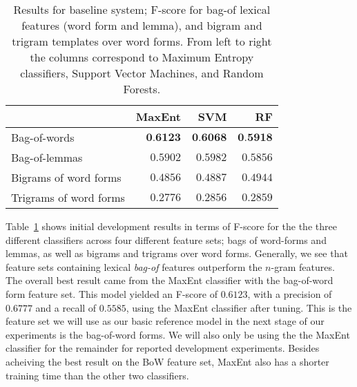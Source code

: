 \documentclass[11pt,letterpaper]{article}
\begin{document}
\begin{table}
  \begin{smaller}
    \begin{center}
      \begin{tabular}{lrrr}
        \toprule

        & MaxEnt & SVM & RF \\
        \midrule
        Bag-of-words & $\textbf{0.6123}$ & $\textbf{0.6068}$ & $\textbf{0.5918}$ \\ %
        Bag-of-lemmas & $0.5902$ & $0.5982$ & $0.5856$ \\
        Bigrams of word forms & $0.4856$ & $0.4887$ & $0.4944$ \\
        Trigrams of word forms & $0.2776$ & $0.2856$ & $0.2859$ \\      
      
        \bottomrule
      \end{tabular}
    \end{center}
    \caption{Results for baseline system; F-score for bag-of lexical features
      (word form and lemma), and bigram and trigram templates over word
      forms. From left to right the columns correspond to Maximum Entropy
      classifiers, Support Vector Machines, and Random Forests.}
    \label{tab:baseline}
  \end{smaller}
\end{table}

Table~\ref{tab:baseline} shows initial development results in terms of F-score for the the three different classifiers across four different feature sets; bags of word-forms and lemmas, as well as bigrams and trigrams over word forms. Generally, we see that feature sets containing lexical \emph{bag-of} features outperform the $n$-gram  features. The overall best result came from the MaxEnt classifier with the bag-of-word form feature set. This model yielded an F-score of $0.6123$, with a precision of $0.6777$ and a recall of $0.5585$, using the MaxEnt classifier after tuning. This is the feature set we will use as our basic reference model in the next stage of our experiments is the bag-of-word forms. We will also only be using the the MaxEnt classifier for the remainder for reported development experiments. Besides acheiving the best result on the BoW feature set, MaxEnt also has a shorter training time than the other two classifiers.%
\end{document}
